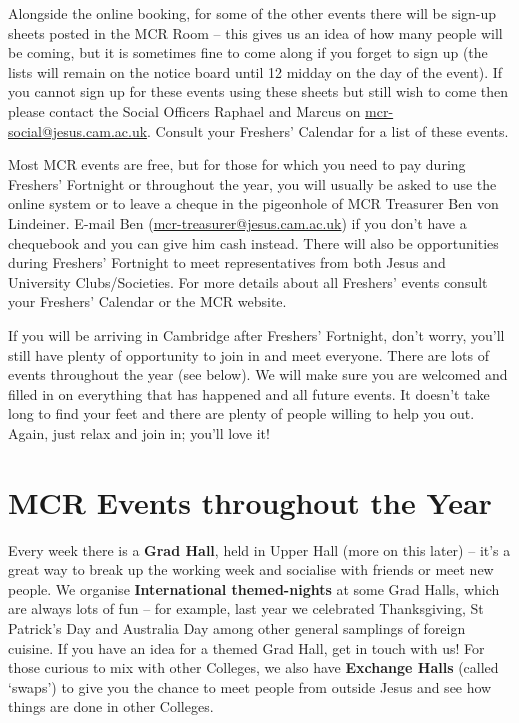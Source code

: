 \documentclass[11pt,fleqn, oneside]{book} %
\begin{document}
Alongside the online booking, for some of the other events there will be sign-up sheets posted in the MCR Room – this gives us an idea of how many people will be coming, but it is sometimes fine to come along if you forget to sign up (the lists will remain on the notice board until 12 midday on the day of the event).  If you cannot sign up for these events using these sheets but still wish to come then please contact the Social Officers Raphael and Marcus on \url{mcr-social@jesus.cam.ac.uk}. Consult your Freshers’ Calendar for a list of these events.

Most MCR events are free, but for those for which you need to pay during Freshers’ Fortnight or throughout the year, you will usually be asked to use the online system or to leave a cheque in the pigeonhole of MCR Treasurer Ben von Lindeiner.  E-mail Ben (\url{mcr-treasurer@jesus.cam.ac.uk}) if you don’t have a chequebook and you can give him cash instead. 
There will also be opportunities during Freshers’ Fortnight to meet representatives from both Jesus and University Clubs/Societies. For more details about all Freshers’ events consult your Freshers’ Calendar or the MCR website.

If you will be arriving in Cambridge after Freshers’ Fortnight, don’t worry, you’ll still have plenty of opportunity to join in and meet everyone. There are lots of events throughout the year (see below). We will make sure you are welcomed and filled in on everything that has happened and all future events.  It doesn’t take long to find your feet and there are plenty of people willing to help you out. Again, just relax and join in; you’ll love it!

\section{MCR Events throughout the Year}

Every week there is a \textbf{Grad Hall}, held in Upper Hall (more on this later) – it’s a great way to break up the working week and socialise with friends or meet new people. We organise \textbf{International themed-nights} at some Grad Halls, which are always lots of fun – for example, last year we celebrated Thanksgiving, St Patrick’s Day and Australia Day among other general samplings of foreign cuisine. If you have an idea for a themed Grad Hall, get in touch with us! For those curious to mix with other Colleges, we also have \textbf{Exchange Halls} (called `swaps') to give you the chance to meet people from outside Jesus and see how things are done in other Colleges.  
\end{document}
